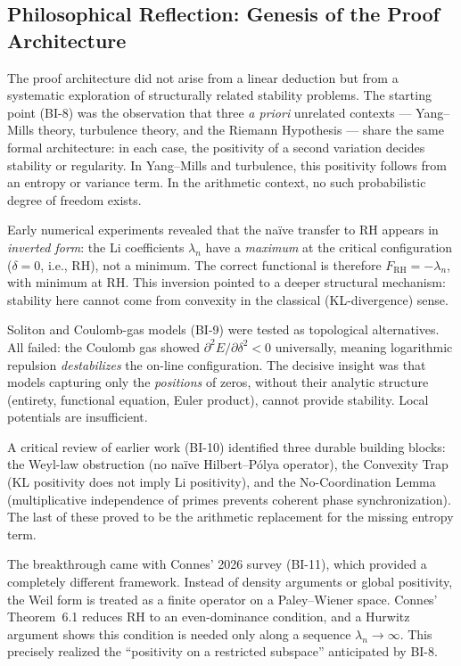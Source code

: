 \documentclass[12pt,a4paper]{article}
\theoremstyle{definition}
\theoremstyle{remark}
\begin{document}
\subsection{Philosophical Reflection: Genesis of the Proof Architecture}

The proof architecture did not arise from a linear deduction but from a systematic exploration of structurally related stability problems. The starting point (BI-8) was the observation that three \emph{a priori} unrelated contexts --- Yang--Mills theory, turbulence theory, and the Riemann Hypothesis --- share the same formal architecture: in each case, the positivity of a second variation decides stability or regularity. In Yang--Mills and turbulence, this positivity follows from an entropy or variance term. In the arithmetic context, no such probabilistic degree of freedom exists.

Early numerical experiments revealed that the na\"ive transfer to RH appears in \emph{inverted form}: the Li coefficients $\lambda_n$ have a \emph{maximum} at the critical configuration ($\delta = 0$, i.e., RH), not a minimum. The correct functional is therefore $F_{\mathrm{RH}} = -\lambda_n$, with minimum at RH. This inversion pointed to a deeper structural mechanism: stability here cannot come from convexity in the classical (KL-divergence) sense.

Soliton and Coulomb-gas models (BI-9) were tested as topological alternatives. All failed: the Coulomb gas showed $\partial^2 E/\partial\delta^2 < 0$ universally, meaning logarithmic repulsion \emph{destabilizes} the on-line configuration. The decisive insight was that models capturing only the \emph{positions} of zeros, without their analytic structure (entirety, functional equation, Euler product), cannot provide stability. Local potentials are insufficient.

A critical review of earlier work (BI-10) identified three durable building blocks: the Weyl-law obstruction (no na\"ive Hilbert--P\'olya operator), the Convexity Trap (KL positivity does not imply Li positivity), and the No-Coordination Lemma (multiplicative independence of primes prevents coherent phase synchronization). The last of these proved to be the arithmetic replacement for the missing entropy term.

The breakthrough came with Connes' 2026 survey \cite{Connes2026} (BI-11), which provided a completely different framework. Instead of density arguments or global positivity, the Weil form is treated as a finite operator on a Paley--Wiener space. Connes' Theorem~6.1 reduces RH to an even-dominance condition, and a Hurwitz argument shows this condition is needed only along a sequence $\lambda_n \to \infty$. This precisely realized the ``positivity on a restricted subspace'' anticipated by BI-8.
\end{document}
